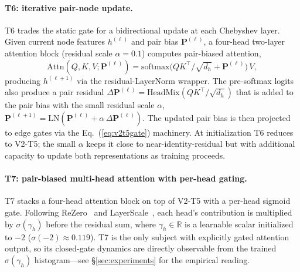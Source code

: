\paragraph{T6: iterative pair-node update.}
\label{sec:t6}
T6 trades the static gate for a bidirectional update at each Chebyshev
layer. Given current node features $h^{(\ell)}$ and pair bias
$\mathbf{P}^{(\ell)}$, a four-head two-layer attention block (residual
scale $\alpha{=}0.1$) computes pair-biased attention,
\begin{equation*}
    \mathrm{Attn}(Q,K,V;\mathbf{P}^{(\ell)}) = \mathrm{softmax}\!\bigl(QK^\top/\sqrt{d_h} + \mathbf{P}^{(\ell)}\bigr)\,V,
\end{equation*}
producing $h^{(\ell+1)}$ via the residual-LayerNorm wrapper. The
pre-softmax logits also produce a pair residual
$\Delta\mathbf{P}^{(\ell)} = \mathrm{HeadMix}(QK^\top/\sqrt{d_h})$ that is
added to the pair bias with the small residual scale $\alpha$,
$\mathbf{P}^{(\ell+1)} = \mathrm{LN}(\mathbf{P}^{(\ell)} + \alpha\,\Delta\mathbf{P}^{(\ell)})$.
The updated pair bias is then projected to edge gates via the
Eq.~(\ref{eq:v2t5gate}) machinery. At initialization T6 reduces to V2-T5;
the small $\alpha$ keeps it close to near-identity-residual but with
additional capacity to update both representations as training proceeds.

\paragraph{T7: pair-biased multi-head attention with per-head gating.}
\label{sec:t7}
T7 stacks a four-head attention block on top of V2-T5 with a per-head
sigmoid gate. Following ReZero~\cite{bachlechner2021rezero} and
LayerScale~\cite{touvron2021cait}, each head's contribution is
multiplied by $\sigma(\gamma_h)$ before the residual sum, where
$\gamma_h\in\mathbb{R}$ is a learnable scalar initialized to $-2$
($\sigma({-}2)\approx 0.119$). T7 is the only subject with explicitly
gated attention output, so its closed-gate dynamics are directly
observable from the trained $\sigma(\gamma_h)$ histogram---see
\S\ref{sec:experiments} for the empirical reading.


